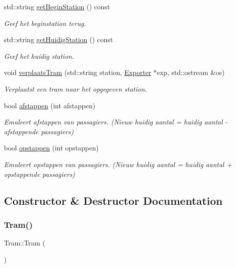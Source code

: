 \begin{DoxyCompactItemize}
std\+::string \hyperlink{class_tram_ae4a7cf6313452140ed54d219d1f6afba}{get\+Begin\+Station} () const
\begin{DoxyCompactList}\small\item\em Geef het beginstation terug. \end{DoxyCompactList}\item 
std\+::string \hyperlink{class_tram_ae1d03c1fb6e0f5f97c57d35fe10fa8dd}{get\+Huidig\+Station} () const
\begin{DoxyCompactList}\small\item\em Geef het huidig station. \end{DoxyCompactList}\item 
void \hyperlink{class_tram_a8d55296c7ede4aa92c9b3a4b2a9495a8}{verplaats\+Tram} (std\+::string station, \hyperlink{class_exporter}{Exporter} $\ast$exp, std\+::ostream \&os)
\begin{DoxyCompactList}\small\item\em Verplaatst een tram naar het opgegeven station. \end{DoxyCompactList}\item 
bool \hyperlink{class_tram_a81186910caa5212b4a87eec84cd10a46}{afstappen} (int afstappen)
\begin{DoxyCompactList}\small\item\em Emuleert afstappen van passagiers. (Nieuw huidig aantal = huidig aantal -\/ afstappende passagiers) \end{DoxyCompactList}\item 
bool \hyperlink{class_tram_aaeb00c535a6854f85dcc42cdff97ad0c}{opstappen} (int opstappen)
\begin{DoxyCompactList}\small\item\em Emuleert opstappen van passagiers. (Nieuw huidig aantal = huidig aantal + opstappende passagiers) \end{DoxyCompactList}\end{DoxyCompactItemize}


\subsection{Constructor \& Destructor Documentation}
\mbox{\label{class_tram_aad83b2e7e79d57528691bf317ab0e1ef}} 
\subsubsection{\texorpdfstring{Tram()}{Tram()}\hspace{0.1cm}{\footnotesize\ttfamily [1/2]}}
{\footnotesize\ttfamily Tram\+::\+Tram (\begin{DoxyParamCaption}{ }\end{DoxyParamCaption})}

